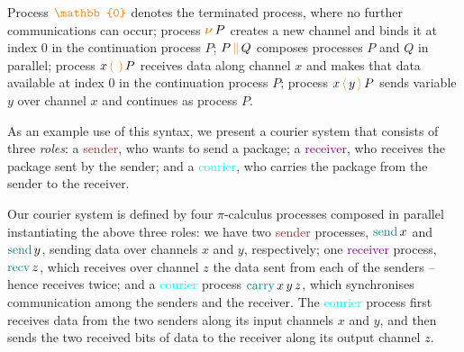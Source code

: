 \documentclass[]{llncs}
\newcommand{\picalc}{$\pi$-calculus}
\newcommand{\constr}[1]{\textcolor{orange}{\operatorname{#1}}}
\newcommand{\func}[1]{\textcolor{teal}{\operatorname{#1}}}
\newcommand{\PO}{\constr{\mathbb{0}}}
\newcommand{\comp}[2]{#1 \, \constr{\parallel} \, #2}
\newcommand{\new}{\constr{\boldsymbol{\nu}} \,}
\newcommand{\send}[2]{#1 \, \constr{\langle} \, #2 \,\constr{\rangle} \,}
\newcommand{\recv}[2]{#1 \, \constr{\mathbb{(}} \, #2 \, \constr{\mathbb{)}} \,}
\newcommand{\sender}{\textcolor{brown}{sender}}
\newcommand{\receiver}{\textcolor{purple}{receiver}}
\newcommand{\courier}{\textcolor{cyan}{courier}}
\begin{document}
Process $\PO$ denotes the terminated process, where no further communications can occur;
process $\new{} P$ creates a new channel and binds it at index $0$ in the continuation process $P$;
$\comp{P}{Q}$ composes processes $P$ and $Q$ in parallel;
process $\recv{x}{}P$ receives data along channel $x$ and makes that data available at index $0$ in the continuation process $P$;
process $\send{x}{y}{P}$ sends variable $y$ over channel $x$ and continues as process $P$.

\begin{example}
\label{example-process}

As an example use of this syntax, we present a courier system that consists of three \emph{roles}:
a \sender{}, who wants to send a package;
a \receiver{}, who receives the package sent by the sender;
and a \courier{}, who carries the package from the sender to the receiver.
\begin{center}
  \small
\end{center}

Our courier system is defined by four \picalc{} processes composed in parallel instantiating the above three roles:
we have two \sender{} processes, $\func{send} \, x$ and $\func{send} \, y$, sending data over channels $x$ and $y$, respectively;
one \receiver{} process, $\func{recv} \, z$, which receives over channel $z$ the data sent from each of the senders -- hence receives twice;
and a \courier{} process $\func{carry} \, x \, y \, z$, which synchronises communication among the senders and the receiver.
The \courier{} process first receives data from the two senders along its input channels $x$ and $y$, and then sends the two received bits of data to the receiver along its output channel $z$.


\end{example}
\end{document}
